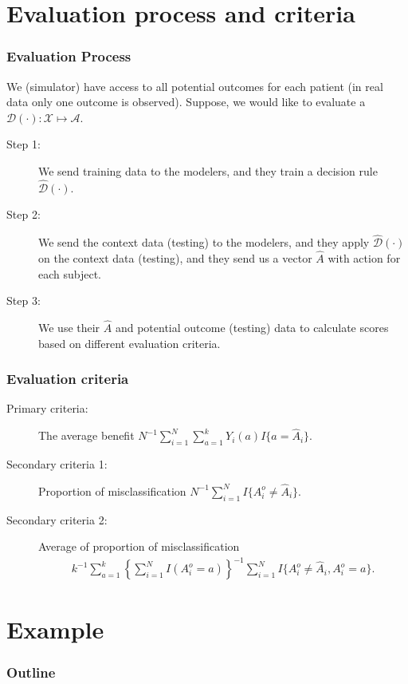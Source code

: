 \documentclass{beamer}
\def\hat{\widehat}
\def\cal{\mathcal}
\def\calA{{\cal A}} %
\def\calX{{\cal X}} %
\def\calD{{\cal D}} %
\begin{document}
\section{Evaluation process and criteria}

\begin{frame}
	\frametitle{Evaluation Process}
	We (simulator) have access to all potential outcomes for each patient (in real data only one outcome is observed). Suppose, we would like to evaluate a $\calD(\cdot): \calX \mapsto \calA$. 
	\begin{description}
		\item[Step 1:] We send training data to the modelers, and they train a decision rule $\hat{\calD}(\cdot)$.
		\item[Step 2:] We send the context data (testing) to the modelers, and they apply $\hat{\calD}(\cdot)$ on the context data (testing), and they send us a vector $\hat{A}$ with action for each subject.
		\item[Step 3:] We use their $\hat{A}$ and potential outcome (testing) data to calculate scores based on different evaluation criteria.
	\end{description}
\end{frame}	

\begin{frame}
	\frametitle{Evaluation criteria}
		\begin{description}
		\item[Primary criteria:]  The average benefit $N^{-1}\sum_{i=1}^{N} \sum_{a=1}^k Y_{i}(a) I\{a=\hat{A}_i\}$.
		\item[Secondary criteria 1:] Proportion of misclassification $N^{-1}\sum_{i=1}^{N} I\{A^o_i \neq \hat{A}_i\}$.
		\item[Secondary criteria 2:] Average of proportion of misclassification
		\begin{eqnarray*}
			k^{-1} \sum_{a=1}^k \left\{\sum_{i=1}^{N} I(A^o_i=a)\right\}^{-1} \sum_{i=1}^{N} I\{A^o_i \neq  \hat{A}_i, A^o_i=a\}.
		\end{eqnarray*}
	\end{description}
\end{frame}	




\section{Example}
\begin{frame}
	\frametitle{Outline}
	\tableofcontents[current]
\end{frame}
\end{document}
